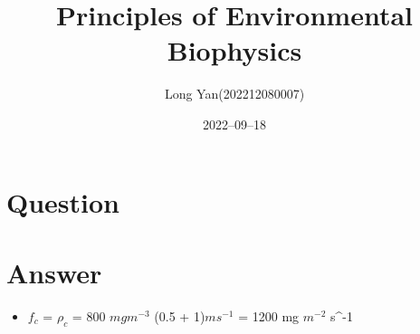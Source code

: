 \documentclass[12pt]{article}
\title{Principles of Environmental Biophysics}
\author{Long Yan(202212080007)}
\date{2022–09–18}
\begin{document}
\maketitle

\section{Question}
\begin{itemize}

\end{itemize}
\section{Answer}
\begin{itemize}
\item $f_c$ = $\rho_c$ \cdot {} =  800 $mg m^{-3}$  \cdot (0.5 + 1)$m s^{-1}$ = 1200 mg $m^{-2}$ s^{-1}
\end{itemize}
\end{document}
